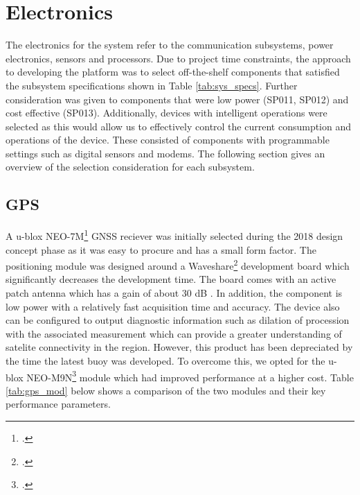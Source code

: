 \section{Electronics}

The electronics for the system refer to the communication subsystems, power electronics, sensors and processors. Due to project time constraints, the approach to developing the platform was to select off-the-shelf components that satisfied the subsystem specifications shown in Table \ref{tab:sys_specs}. Further consideration was given to components that were low power (SP011, SP012) and cost effective (SP013). Additionally, devices with intelligent operations were selected as this would allow us to effectively control the current consumption and operations of the device. These consisted of components with programmable settings such as digital sensors and modems. The following section gives an overview of the selection consideration for each subsystem.

\subsection{GPS}

A u-blox NEO-7M\footcite{UBLOX_M7N_DATA} GNSS reciever was initially selected during the 2018 design concept phase as it was easy to procure and has a small form factor. The positioning  module was designed around a Waveshare\footcite{waveshare} development board which significantly decreases the development time. The board comes with an active patch antenna which has a gain of about 30 dB \cite{waveshare}. In addition, the component is low power with a relatively fast acquisition time and accuracy. The device also can be configured to output diagnostic information such as dilation of procession with the associated measurement which can provide a greater understanding of satelite connectivity in the region. However,  this product has been depreciated by the time the latest buoy was developed. To overcome this, we opted for the u-blox NEO-M9N\footcite{UBLOX_M9N_DATA} module which had improved performance at a higher cost. Table \ref{tab:gps_mod} below shows a comparison of the two modules and their key performance parameters.

